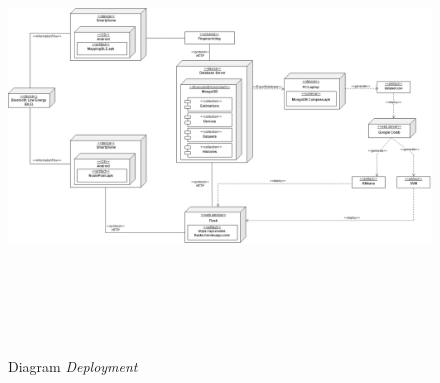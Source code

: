 \vspace{-0.2cm}
\begin{landscape}
	\begin{figure}[H]
		\center
		\includegraphics [width = 22.5cm, height=12cm]{gambar/model/diagramdeployment.png}
		\caption{Diagram \textit{Deployment}}
		\label{deployment-diagram}
	\end{figure}
\end{landscape}

